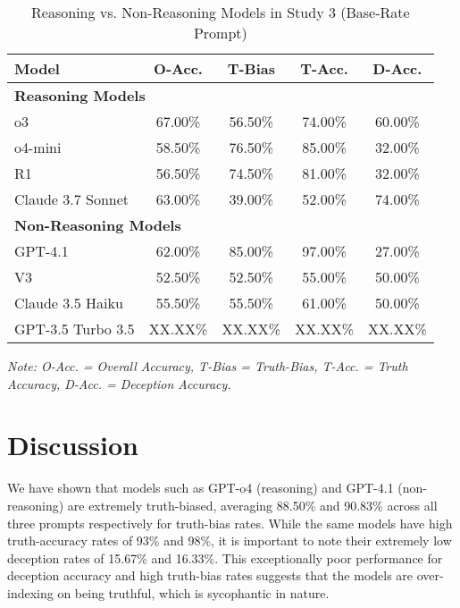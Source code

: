 \documentclass{article}
\begin{document}
\begin{table}[ht]
\centering
\caption{Reasoning vs. Non-Reasoning Models in Study 3 (Base-Rate Prompt)}
\begin{tabular}{lcccc}
\toprule
\textbf{Model} & \textbf{O-Acc.} & \textbf{T-Bias} & \textbf{T-Acc.} & \textbf{D-Acc.} \\
\midrule
\multicolumn{5}{l}{\textbf{Reasoning Models}} \\
o3 & 67.00\% & 56.50\% & 74.00\% & 60.00\% \\
o4-mini & 58.50\% & 76.50\% & 85.00\% & 32.00\% \\
R1 & 56.50\% & 74.50\% & 81.00\% & 32.00\% \\
Claude 3.7 Sonnet & 63.00\% & 39.00\% & 52.00\% & 74.00\% \\
\midrule
\multicolumn{5}{l}{\textbf{Non-Reasoning Models}} \\
GPT-4.1 & 62.00\% & 85.00\% & 97.00\% & 27.00\% \\
V3 & 52.50\% & 52.50\% & 55.00\% & 50.00\% \\
Claude 3.5 Haiku & 55.50\% & 55.50\% & 61.00\% & 50.00\% \\
GPT-3.5 Turbo 3.5 & XX.XX\% & XX.XX\% & XX.XX\% & XX.XX\% \\
\bottomrule
\end{tabular}
\begin{minipage}{0.7\linewidth}
\vspace{0.05in}
\footnotesize
\textit{Note: O-Acc. = Overall Accuracy, T-Bias = Truth-Bias, T-Acc. = Truth Accuracy, D-Acc. = Deception Accuracy.}
\end{minipage}
\label{tab:study1_model_comparison}
\end{table}

\section{Discussion}

We have shown that models such as GPT-o4 (reasoning) and GPT-4.1 (non-reasoning) are extremely truth-biased, averaging 88.50\% and 90.83\% across all three prompts respectively for truth-bias rates. While the same models have high truth-accuracy rates of 93\% and 98\%, it is important to note their extremely low deception rates of 15.67\% and 16.33\%. This exceptionally poor performance for deception accuracy and high truth-bias rates suggests that the models are over-indexing on being truthful, which is sycophantic in nature.
\end{document}
